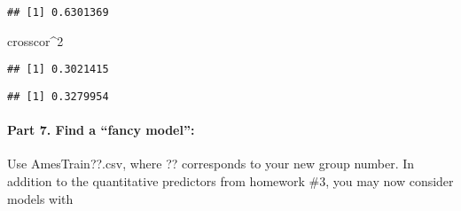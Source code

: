 \documentclass[
]{article}
\newenvironment{Shaded}{\begin{snugshade}}{\end{snugshade}}
\newcommand{\DecValTok}[1]{\textcolor[rgb]{0.00,0.00,0.81}{#1}}
\newcommand{\KeywordTok}[1]{\textcolor[rgb]{0.13,0.29,0.53}{\textbf{#1}}}
\newcommand{\NormalTok}[1]{#1}
\newcommand{\OperatorTok}[1]{\textcolor[rgb]{0.81,0.36,0.00}{\textbf{#1}}}
\newcommand{\StringTok}[1]{\textcolor[rgb]{0.31,0.60,0.02}{#1}}
\begin{document}
\begin{Shaded}
\end{Shaded}

\begin{verbatim}
## [1] 0.6301369
\end{verbatim}

\begin{Shaded}
\begin{Highlighting}[]
\NormalTok{crosscor}\OperatorTok{^}\DecValTok{2}
\end{Highlighting}
\end{Shaded}

\begin{verbatim}
## [1] 0.3021415
\end{verbatim}

\begin{Shaded}
\end{Shaded}

\begin{verbatim}
## [1] 0.3279954
\end{verbatim}

\hypertarget{part-7.-find-a-fancy-model}{%
\paragraph{Part 7. Find a ``fancy
model'':}\label{part-7.-find-a-fancy-model}}

Use AmesTrain??.csv, where ?? corresponds to your new group number. In
addition to the quantitative predictors from homework \#3, you may now
consider models with
\end{document}
